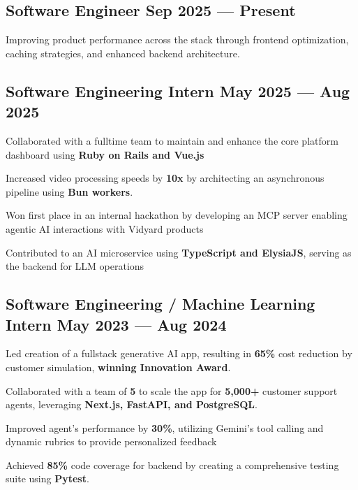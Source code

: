 \subsection{{Software Engineer \hfill Sep 2025 --- Present}}
\begin{zitemize}
    \item Improving product performance across the stack through frontend optimization, caching strategies, and enhanced backend architecture.
\end{zitemize}


\subsection{{Software Engineering Intern \hfill May 2025 --- Aug 2025}}
\begin{zitemize}
    \item Collaborated with a fulltime team to maintain and enhance the core platform dashboard using \textbf{Ruby on Rails and Vue.js}  
    \item Increased video processing speeds by \textbf{10x} by architecting an asynchronous pipeline using \textbf{Bun workers}.
    \item Won first place in an internal hackathon by developing an MCP server enabling agentic AI interactions with Vidyard products
    \item Contributed to an AI microservice using \textbf{TypeScript and ElysiaJS}, serving as the backend for LLM operations
    
\end{zitemize}


\subsection{{Software Engineering / Machine Learning Intern \hfill May 2023 --- Aug 2024}}
\begin{zitemize}
    \item Led creation of a fullstack generative AI app, resulting in \textbf{65\%} cost reduction by customer simulation, \textbf{winning Innovation Award}.
    \item Collaborated with a team of \textbf{5} to scale the app for \textbf{5,000+} customer support agents, leveraging \textbf{Next.js, FastAPI, and PostgreSQL}.
    \item Improved agent's performance by \textbf{30\%}, utilizing Gemini's tool calling and dynamic rubrics to provide personalized feedback
    \item Achieved \textbf{85\%} code coverage for backend by creating a comprehensive testing suite using \textbf{Pytest}.
\end{zitemize}

